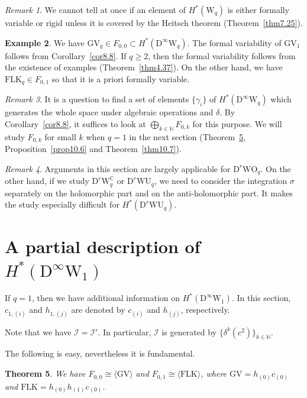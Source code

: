 \documentclass[12pt]{amsart}
\newcommand{\C}{{\mathbb C}}
\newcommand{\N}{{\mathbb N}}
\newcommand{\GV}{\mathrm{GV}}
\newcommand{\FLK}{\mathrm{FLK}}
\newcommand{\WU}{\mathrm{WU}}
\newcommand{\WO}{\mathrm{WO}}
\newcommand{\W}{\mathrm{W}}
\newcommand{\D}{\mathrm{D}}
\newtheorem{theorem}{Theorem}[section]
\theoremstyle{definition}
\newtheorem{example}[theorem]{Example}
\theoremstyle{remark}
\newtheorem{remark}[theorem]{Remark}
\begin{document}
\begin{remark}
We cannot tell at once if an element of $H^*(\W_q)$ is either formally variable or rigid unless it is covered by the Heitsch theorem (Theorem~\ref{thm7.25}).
\end{remark}

\begin{example}
We have $\GV_q\in F_{0,0}\subset H^*(\D^\infty\W_q)$.
The formal variability of $\GV_1$ follows from Corollary~\ref{cor8.8}.
If $q\geq2$, then the formal variability follows from the existence of examples (Theorem~\ref{thm4.37}).
On the other hand, we have $\FLK_q\in F_{0,1}$ so that it is a priori formally variable.
\end{example}

\begin{remark}
It is a question to find a set of elements $\{\gamma_i\}$ of $H^*(\D^\infty\W_q)$ which generates the whole space under algebraic operations and $\delta$.
By Corollary~\ref{cor8.8}, it suffices to look at $\bigoplus_{k\in\N}F_{0,k}$ for this purpose.
We will study $F_{0,k}$ for small $k$ when $q=1$ in the next section (Theorem~\ref{thm10.1}, Proposition~\ref{prop10.6} and Theorem~\ref{thm10.7}).
\end{remark}

\begin{remark}
Arguments in this section are largely applicable for $\D^r\WO_q$.
On the other hand, if we study $\D^r\W^\C_q$ or $\D^r\WU_q$, we need to consider the integration $\sigma$ separately on the holomorphic part and on the anti-holomorphic part.
It makes the study especially difficult for $H^*(\D^r\WU_q)$.
\end{remark}

\section{A partial description of $H^*(\D^\infty\W_1)$}
If $q=1$, then we have additional information on $H^*(\D^\infty\W_1)$.
In this section, $c_{1,(i)}$ and $h_{1,(j)}$ are denoted by $c_{(i)}$ and $h_{(j)}$, respectively.

Note that we have $\mathscr{I}=\mathscr{I}'$.
In particular, $\mathscr{I}$ is generated by $\{\delta^k(c^2)\}_{k\in\N}$.

The following is easy, nevertheless it is fundamental.

\begin{theorem}
\label{thm10.1}
We have $F_{0,0}\cong\langle\GV\rangle$ and $F_{0,1}\cong\langle\FLK\rangle$, where $\GV=h_{(0)}c_{(0)}$ and $\FLK=h_{(0)}h_{(1)}c_{(0)}$.
\end{theorem}
\end{document}

